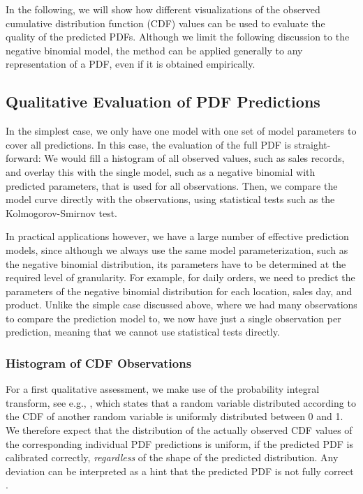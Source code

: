 \documentclass[BCOR=1mm, DIV=calc,10pt,
twoside=true,
twocolumn,
headings=normal]{scrartcl}
\begin{document}
In the following, we will show how different visualizations of the observed cumulative distribution function (CDF) values can be used to evaluate the quality of the predicted PDFs. Although we limit the following discussion to the negative binomial model, the method can be applied generally to any representation of a PDF, even if it is obtained empirically.

\subsection{Qualitative Evaluation of PDF Predictions}

In the simplest case, we only have one model with one set of model parameters to cover all predictions. In this case, the evaluation of the full PDF is straight-forward: We would fill a histogram of all observed values, such as sales records, and overlay this with the single model, such as a negative binomial with predicted parameters, that is used for all observations. Then, we compare the model curve directly with the observations, using statistical tests such as the Kolmogorov-Smirnov test.

In practical applications however, we have a large number of effective prediction models, since although we always use the same model parameterization, such as the negative binomial distribution, its parameters have to be determined at the required level of granularity. For example, for daily orders, we need to predict the parameters of the negative binomial distribution for each location, sales day, and product. Unlike the simple case discussed above, where we had many observations to compare the prediction model to, we now have just a single observation per prediction, meaning that we cannot use statistical tests directly.

\subsubsection{Histogram of CDF Observations}
\label{sec:cdf_histo}

For a first qualitative assessment, we make use of the probability integral transform, see e.g., \cite{Angus1994,casella2002statistical}, which states that a random variable distributed according to the CDF of another random variable is uniformly distributed between 0 and 1. We therefore expect that the distribution of the actually observed CDF values of the corresponding individual PDF predictions is uniform, if the predicted PDF is calibrated correctly, {\em regardless} of the shape of the predicted distribution. Any deviation can be interpreted as a hint that the predicted PDF is not fully correct \cite{diebold1998vevaluating}.
\end{document}
